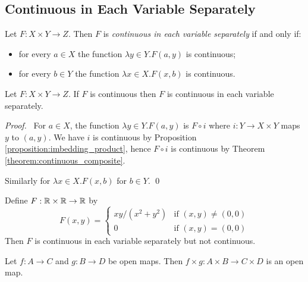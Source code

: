 \subsection{Continuous in Each Variable Separately}

\begin{definition}
    Let $F : X \times Y \rightarrow Z$. Then $F$ is \emph{continuous in each
    variable separately} if and only if:
    \begin{itemize}
        \item for every $a \in X$ the function $\lambda y \in Y. F(a,y)$ is continuous;
        \item for every $b \in Y$ the function $\lambda x \in X. F(x,b)$ is continuous.
    \end{itemize}
\end{definition}

\begin{proposition}
    Let $F : X \times Y \rightarrow Z$. If $F$ is continuous then $F$ is continuous in each
    variable separately.
\end{proposition}

\begin{proof}
    \pf\ For $a \in X$, the function $\lambda y \in Y. F(a,y)$ is $F \circ i$ where $i : Y \rightarrow X \times Y$ maps $y$ to $(a,y)$.
    We have $i$ is continuous by Proposition \ref{proposition:imbedding_product}, hence $F \circ i$ is continuous by Theorem \ref{theorem:continuous_composite}.

    Similarly for $\lambda x \in X. F(x,b)$ for $b \in Y$. \qed
\end{proof}

\begin{example}
    Define $F : \mathbb{R} \times \mathbb{R} \rightarrow \mathbb{R}$ by
    \[ F(x,y) = \begin{cases}
        xy / (x^2 + y^2) & \text{if } (x,y) \neq (0,0) \\
        0 & \text{if } (x,y) = (0,0)
    \end{cases} \]
    Then $F$ is continuous in each variable separately but not continuous.
\end{example}

\begin{proposition}
    \label{proposition:open_map_product}
    Let $f : A \rightarrow C$ and $g : B \rightarrow D$ be open maps. Then $f \times g : A \times B \rightarrow C \times D$ is an open map.
\end{proposition}

